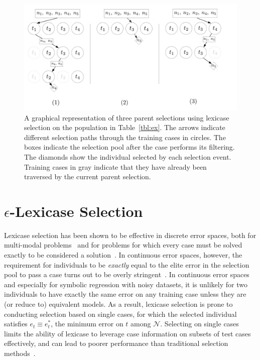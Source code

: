 \documentclass[twoside]{article}
\begin{document}
\begin{figure}[tb]
\centering
  \includegraphics[height = 0.3\textheight]{figs/lex_graph_v3.pdf}
  \caption{A graphical representation of three parent selections using lexicase selection on the population in Table~\ref{tbl:ex}. The arrows indicate different selection paths through the training cases in circles. The boxes indicate the selection pool after the case performs its filtering. The diamonds show the individual selected by each selection event. Training cases in gray indicate that they have already been traversed by the current parent selection.}\label{fig:lex_graph}
\end{figure}

\section{{\large $\epsilon$}-Lexicase Selection}\label{s:eplex}

Lexicase selection has been shown to be effective in discrete error spaces, both for multi-modal problems~\citep{spector_assessment_2012} and for problems for which every case must be solved exactly to be considered a solution~\citep{helmuth_solving_2014, helmuth_general_2015-1}. In continuous error spaces, however, the requirement for individuals to be {\it exactly} equal to the elite error in the selection pool to pass a case turns out to be overly stringent~\citep{la_cava_epsilon-lexicase_2016}. In continuous error spaces and especially for symbolic regression with noisy datasets, it is unlikely for two individuals to have exactly the same error on any training case unless they are (or reduce to) equivalent models. As a result, lexicase selection is prone to conducting selection based on single cases, for which the selected individual satisfies $e_t \equiv e^*_t$, the minimum error on $t$ among $\mathcal{N}$. Selecting on single cases limits the ability of lexicase to leverage case information on subsets of test cases effectively, and can lead to poorer performance than traditional selection methods~\citep{la_cava_epsilon-lexicase_2016}. 
\end{document}
